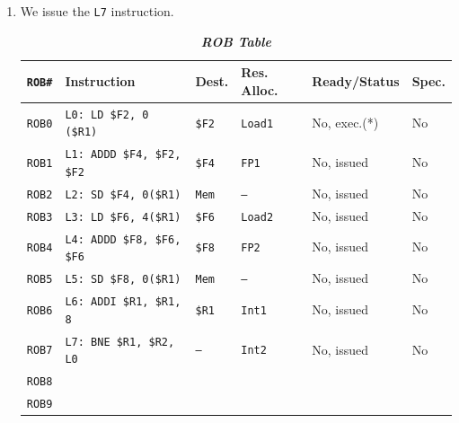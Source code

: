 \begin{enumerate}
    \item We issue the \texttt{L7} instruction.
    \begin{table}[!htp]
        \centering
        \begin{adjustbox}{width={\textwidth},totalheight={\textheight},keepaspectratio}
            \begin{tabular}{@{} l l l l l l @{}}
                \toprule
                \texttt{ROB\#}  & \textbf{Instruction} & \textbf{Dest.} & \textbf{Res. Alloc.} & \textbf{Ready/Status} & \textbf{Spec.} \\
                \midrule
                \texttt{ROB0}   & \texttt{L0: LD \$F2, 0 (\$R1)}    & \texttt{\$F2} & \texttt{Load1}    & No, exec.(*)  & No    \\ [.3em]
                \texttt{ROB1}   & \texttt{L1: ADDD \$F4, \$F2, \$F2}& \texttt{\$F4} & \texttt{FP1}      & No, issued    & No    \\ [.3em]
                \texttt{ROB2}   & \texttt{L2: SD \$F4, 0(\$R1)}     & \texttt{Mem}  & \texttt{--}       & No, issued    & No    \\ [.3em]
                \texttt{ROB3}   & \texttt{L3: LD \$F6, 4(\$R1)}     & \texttt{\$F6} & \texttt{Load2}    & No, issued    & No    \\ [.3em]
                \texttt{ROB4}   & \texttt{L4: ADDD \$F8, \$F6, \$F6}& \texttt{\$F8} & \texttt{FP2}      & No, issued    & No    \\ [.3em]
                \texttt{ROB5}   & \texttt{L5: SD \$F8, 0(\$R1)}     & \texttt{Mem}  & \texttt{--}       & No, issued    & No    \\ [.3em]
                \texttt{ROB6}   & \texttt{L6: ADDI \$R1, \$R1, 8}   & \texttt{\$R1} & \texttt{Int1}     & No, issued    & No    \\ [.3em]
                \texttt{ROB7}   & \texttt{L7: BNE \$R1, \$R2, L0}   & \texttt{--}   & \texttt{Int2}     & No, issued    & No    \\ [.3em]
                \texttt{ROB8}   &                                   &               &                   &               &       \\ [.3em]
                \texttt{ROB9}   &                                   &               &                   &               &       \\
                \bottomrule
            \end{tabular}
        \end{adjustbox}
        \caption*{\emph{\textbf{ROB Table}}}
    \end{table}



\end{enumerate}
